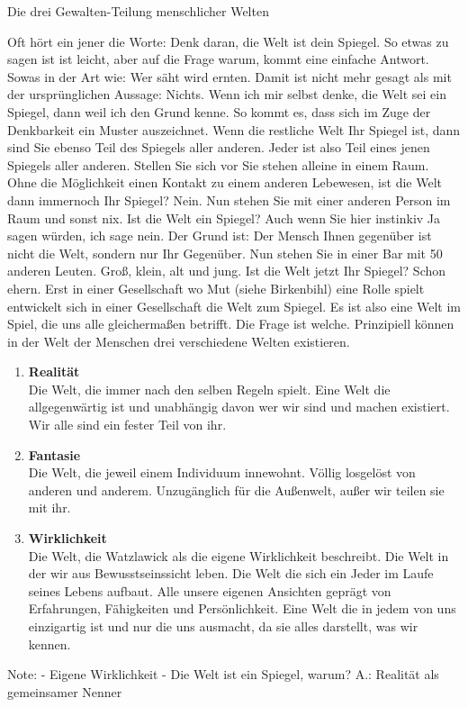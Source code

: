 Die drei Gewalten-Teilung menschlicher Welten

Oft hört ein jener die Worte: Denk daran, die Welt ist dein Spiegel. So etwas zu sagen ist ist leicht, aber auf die Frage warum, kommt eine einfache Antwort.
Sowas in der Art wie: Wer säht wird ernten. Damit ist nicht mehr gesagt als mit der ursprünglichen Aussage: Nichts. Wenn ich mir selbst denke, die Welt sei ein Spiegel,
dann weil ich den Grund kenne. So kommt es, dass sich im Zuge der Denkbarkeit ein Muster auszeichnet. Wenn die restliche Welt Ihr Spiegel ist, dann sind Sie ebenso
Teil des Spiegels aller anderen. Jeder ist also Teil eines jenen Spiegels aller anderen. Stellen Sie sich vor Sie stehen alleine in einem Raum. Ohne die Möglichkeit einen
Kontakt zu einem anderen Lebewesen, ist die Welt dann immernoch Ihr Spiegel? Nein. Nun stehen Sie mit einer anderen Person im Raum und sonst nix. Ist die Welt ein Spiegel?
Auch wenn Sie hier instinkiv Ja sagen würden, ich sage nein. Der Grund ist: Der Mensch Ihnen gegenüber ist nicht die Welt, sondern nur Ihr Gegenüber. Nun stehen Sie in einer
Bar mit 50 anderen Leuten. Groß, klein, alt und jung. Ist die Welt jetzt Ihr Spiegel? Schon ehern. Erst in einer Gesellschaft wo Mut (siehe Birkenbihl) eine Rolle spielt entwickelt
sich in einer Gesellschaft die Welt zum Spiegel. Es ist also eine Welt im Spiel, die uns alle gleichermaßen betrifft. Die Frage ist welche. Prinzipiell können in der Welt der Menschen
drei verschiedene Welten existieren.
\begin{enumerate}
    \item \textbf{Realität}\\
    Die Welt, die immer nach den selben Regeln spielt. Eine Welt die allgegenwärtig ist und unabhängig davon wer wir sind und machen existiert. Wir alle sind ein fester Teil von ihr.
    \item \textbf{Fantasie}\\
    Die Welt, die jeweil einem Individuum innewohnt. Völlig losgelöst von anderen und anderem. Unzugänglich für die Außenwelt, außer wir teilen sie mit ihr.
    \item \textbf{Wirklichkeit}\\
    Die Welt, die Watzlawick als die eigene Wirklichkeit beschreibt. Die Welt in der wir aus Bewusstseinssicht leben. Die Welt die sich ein Jeder im Laufe seines Lebens aufbaut.
    Alle unsere eigenen Ansichten geprägt von Erfahrungen, Fähigkeiten und Persönlichkeit. Eine Welt die in jedem von uns einzigartig ist und nur die uns ausmacht, da sie alles darstellt, was wir kennen.
    
\end{enumerate}









Note:
- Eigene Wirklichkeit
- Die Welt ist ein Spiegel, warum? A.: Realität als gemeinsamer Nenner
